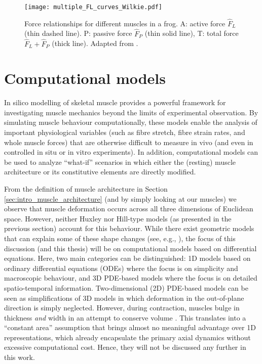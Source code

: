 \documentclass{sfuthesis}
\numberwithin{equation}{section}
\numberwithin{figure}{chapter}
\numberwithin{table}{chapter}
\theoremstyle{definition}
\begin{document}
\begin{figure}
    \centering
    \texttt{[image: multiple\_FL\_curves\_Wilkie.pdf]}
    \caption{Force relationships for different muscles in a frog. A: active force $\widehat{F}_L$ (thin dashed line). P: passive force $\widehat{F}_P$ (thin solid line), T: total force $\widehat{F}_L + \widehat{F}_P$ (thick line). Adapted from \cite{RassierMacintoshHerzog1999}.
    \label{fig:fl_curves_wilkie}}
\end{figure}


\section{Computational models}

In silico modelling of skeletal muscle provides a powerful framework for investigating muscle mechanics beyond the limits of experimental observation. By simulating muscle behaviour computationally, these models enable the analysis of important physiological variables (such as fibre stretch, fibre strain rates, and whole muscle forces) that are otherwise difficult to measure in vivo (and even in controlled in situ or in vitro experiments). In addition, computational models can be used to analyze ``what-if'' scenarios in which either the (resting) muscle architecture or its constitutive elements are directly modified.

From the definition of muscle architecture in Section \ref{sec:intro_muscle_architecture} (and by simply looking at our muscles) we observe that muscle deformation occurs across all three dimensions of Euclidean space. However, neither Huxley nor Hill-type models (as presented in the previous section) account for this behaviour. While there exist geometric models that can explain some of these shape changes (see, e.g., \cite{DickWakeling2018,Siebert20123D}), the focus of this discussion (and this thesis) will be on computational models based on differential equations. Here, two main categories can be distinguished: 1D models based on ordinary differential equations (ODEs) where the focus is on simplicity and macroscopic behaviour, and 3D PDE-based models where the focus is on detailed spatio-temporal information. Two-dimensional (2D) PDE-based models can be seen as simplifications of 3D models in which deformation in the out-of-plane direction is simply neglected. However, during contraction, muscles bulge in thickness \textit{and} width in an attempt to conserve volume \cite{BaskinPaolini}. This translates into a ``constant area'' assumption \cite{EpsteinHerzog2003} that brings almost no meaningful advantage over 1D representations, which already encapsulate the primary axial dynamics without excessive computational cost. Hence, they will not be discussed any further in this work.
\end{document}
